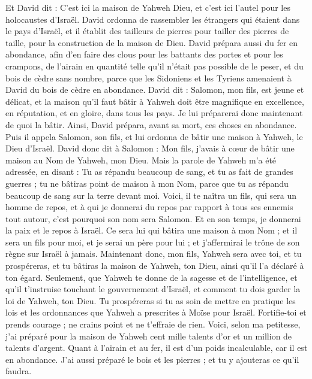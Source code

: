 \begin{multicols}{2}
\VerseOne{}Et David dit : C'est ici la maison de Yahweh Dieu, et c'est ici l'autel pour les holocaustes d'Israël.
David ordonna de rassembler les étrangers qui étaient dans le pays d'Israël, et il établit des tailleurs de pierres pour tailler des pierres de taille, pour la construction de la maison de Dieu.
David prépara aussi du fer en abondance, afin d'en faire des clous pour les battants des portes et pour les crampons, de l'airain en quantité telle qu'il n'était pas possible de le peser,
et du bois de cèdre sans nombre, parce que les Sidoniens et les Tyriens amenaient à David du bois de cèdre en abondance.
David dit : Salomon, mon fils, est jeune et délicat, et la maison qu'il faut bâtir à Yahweh doit être magnifique en excellence, en réputation, et en gloire, dans tous les pays. Je lui préparerai donc maintenant de quoi la bâtir. Ainsi, David prépara, avant sa mort, ces choses en abondance.
Puis il appela Salomon, son fils, et lui ordonna de bâtir une maison à Yahweh, le Dieu d'Israël.
David donc dit à Salomon : Mon fils, j'avais à cœur de bâtir une maison au Nom de Yahweh, mon Dieu.
Mais la parole de Yahweh m'a été adressée, en disant : Tu as répandu beaucoup de sang, et tu as fait de grandes guerres ; tu ne bâtiras point de maison à mon Nom, parce que tu as répandu beaucoup de sang sur la terre devant moi.
Voici, il te naîtra un fils, qui sera un homme de repos, et à qui je donnerai du repos par rapport à tous ses ennemis tout autour, c'est pourquoi son nom sera Salomon. Et en son temps, je donnerai la paix et le repos à Israël.
Ce sera lui qui bâtira une maison à mon Nom ; et il sera un fils pour moi, et je serai un père pour lui ; et j'affermirai le trône de son règne sur Israël à jamais.
Maintenant donc, mon fils, Yahweh sera avec toi, et tu prospéreras, et tu bâtiras la maison de Yahweh, ton Dieu, ainsi qu'il l'a déclaré à ton égard.
Seulement, que Yahweh te donne de la sagesse et de l'intelligence, et qu'il t'instruise touchant le gouvernement d'Israël, et comment tu dois garder la loi de Yahweh, ton Dieu.
Tu prospéreras si tu as soin de mettre en pratique les lois et les ordonnances que Yahweh a prescrites à Moïse pour Israël. Fortifie-toi et prends courage ; ne crains point et ne t'effraie de rien.
Voici, selon ma petitesse, j'ai préparé pour la maison de Yahweh cent mille talents d'or et un million de talents d'argent. Quant à l'airain et au fer, il est d'un poids incalculable, car il est en abondance. J'ai aussi préparé le bois et les pierres ; et tu y ajouteras ce qu'il faudra.

\end{multicols}
